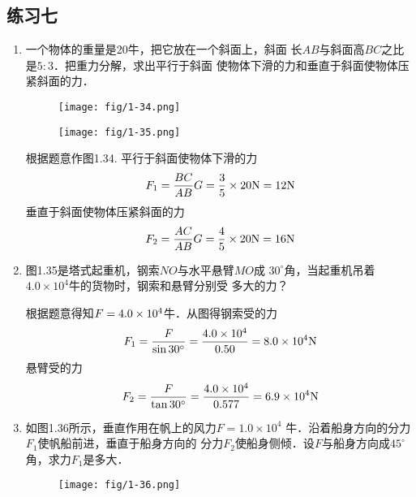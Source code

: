 \subsection{练习七}
\begin{enumerate}

\item 一个物体的重量是20牛，把它放在一个斜面上，斜面
长$AB$与斜面高$BC$之比是$5:3$．把重力分解，求出平行于斜面
使物体下滑的力和垂直于斜面使物体压紧斜面的力．
 \begin{figure}[htp]\centering
    \begin{minipage}[t]{0.48\textwidth}
    \centering
\texttt{[image: fig/1-34.png]}
    \caption{}
    \end{minipage}
    \begin{minipage}[t]{0.48\textwidth}
    \centering
    \texttt{[image: fig/1-35.png]}
    \caption{}
    \end{minipage}
    \end{figure}

\begin{solution}
根据题意作图1.34. 平行于斜面使物体下滑的力
\[F_1=\frac{BC}{AB}G=\frac{3}{5}\times 20{\rm N}=12{\rm N}\]
垂直于斜面使物体压紧斜面的力
\[F_2=\frac{AC}{AB}G=\frac{4}{5}\times20{\rm N}=16{\rm N}\]    
\end{solution}


\item 图1.35是塔式起重机，钢索$NO$与水平悬臂$MO$成
$30^\circ$角，当起重机吊着$4.0\times 10^4$牛的货物时，钢索和悬臂分别受
多大的力？
 
\begin{solution}
    根据题意得知$F=4.0\times10^4$牛．从图得钢索受的力
\[F_1=\frac{F}{\sin 30^{\circ}}=\frac{4.0\times10^4}{0.50}=8.0\times10^4{\rm N}\]
悬臂受的力
\[F_2=\frac{F}{\tan 30^{\circ}}=\frac{4.0\times10^4}{0.577}=6.9\times10^4{\rm N}\]
\end{solution}
\item 如图1.36所示，垂直作用在帆上的风力$F=1.0\times 10^4$
牛．沿着船身方向的分力$F_1$使帆船前进，垂直于船身方向的
分力$F_2$使船身侧倾．设$F$与船身方向成$45^\circ$角，求力$F_1$是多大．
\begin{figure}[htp]\centering
    \begin{minipage}[t]{0.48\textwidth}
    \centering
       \texttt{[image: fig/1-36.png]}
    \caption{}
    \end{minipage}
    \begin{minipage}[t]{0.48\textwidth}
    \centering
\end{minipage}
\end{figure}
\end{enumerate}
